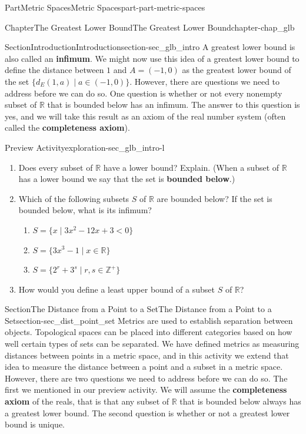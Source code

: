 \documentclass[oneside,10pt,]{book}
\newcommand{\terminology}[1]{\textbf{#1}}
\numberwithin{equation}{chapter}
\newcommand{\Z}{\mathbb{Z}}
\newcommand{\R}{\mathbb{R}}
\newcommand{\lt}{<}
\begin{document}
\begin{partptx}{Part}{Metric Spaces}{}{Metric Spaces}{}{}{part-part-metric-spaces}
\begin{chapterptx}{Chapter}{The Greatest Lower Bound}{}{The Greatest Lower Bound}{}{}{chapter-chap_glb}
\begin{sectionptx}{Section}{Introduction}{}{Introduction}{}{}{section-sec_glb_intro}
 A greatest lower bound is also called an \terminology{infimum}. We might now use this idea of a greatest lower bound to define the distance between \(1\) and \(A = (-1,0)\) as the greatest lower bound of the set \(\{d_E(1,a) \mid a \in (-1,0)\}\). However, there are questions we need to address before we can do so. One question is whether or not every nonempty subset of \(\R\) that is bounded below has an infimum. The answer to this question is yes, and we will take this result as an axiom of the real number system (often called the \terminology{completeness axiom}).%
\begin{exploration}{Preview Activity}{}{exploration-sec_glb_intro-l}%
\begin{enumerate}[font=\bfseries,label=(\alph*),ref=\alph*]%
\item{}Does every subset of \(\R\) have a lower bound? Explain. (When a subset of \(\R\) has a lower bound we say that the set is \terminology{bounded below}.)%
\item{}Which of the following subsets \(S\) of \(\R\) are bounded below? If the set is bounded below, what is its infimum?%
\begin{enumerate}[font=\bfseries,label=(\roman*),ref=\theenumi.\roman*]%
\item{}\(S = \{x \mid 3x^2-12x+3 \lt 0\}\)%
\item{}\(S = \{3x^3-1 \mid x \in \R\}\)%
\item{}\(S = \{2^r+3^s \mid r, s \in \Z^+\}\)%
\end{enumerate}%
\item{}How would you define a least upper bound of a subset \(S\) of \(\R\)?%
\end{enumerate}%
\end{exploration}%
\end{sectionptx}
%
%
\typeout{************************************************}
\typeout{************************************************}
%
\begin{sectionptx}{Section}{The Distance from a Point to a Set}{}{The Distance from a Point to a Set}{}{}{section-sec_dist_point_set}
Metrics are used to establish separation between objects. Topological spaces can be placed into different categories based on how well certain types of sets can be separated. We have defined metrics as measuring distances between points in a metric space, and in this activity we extend that idea to measure the distance between a point and a subset in a metric space. However, there are two questions we need to address before we can do so. The first we mentioned in our preview activity. We will assume the \terminology{completeness axiom} of the reals, that is that any subset of \(\R\) that is bounded below always has a greatest lower bound. The second question is whether or not a greatest lower bound is unique.%

\end{sectionptx}
\end{chapterptx}
\end{partptx}
\end{document}

